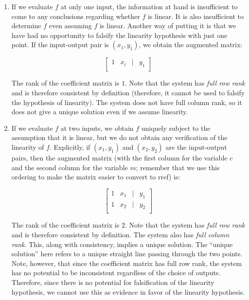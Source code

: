 \documentclass[10pt]{amsart}
\begin{document}
\begin{enumerate}
\item If we evaluate $f$ at only one input, the information at hand is
  insufficient to come to any conclusions regarding whether $f$ is
  linear. It is also insufficient to determine $f$ even assuming $f$
  is linear. Another way of putting it is that we have had no
  opportunity to falsify the linearity hypothesis with just one
  point. If the input-output pair is $(x_1,y_1)$, we obtain the
  augmented matrix:

  $$\left[ \begin{matrix} 1 & x_i & \mid & y_1 \\\end{matrix} \right]$$

  The rank of the coefficient matrix is $1$. Note that the system has
  {\em full row rank} and is therefore consistent by definition
  (therefore, it cannot be used to falsify the hypothesis of
  linearity). The system does not have full column rank, so it does
  not give a unique solution even if we assume linearity.

\item If we evaluate $f$ at two inputs, we obtain $f$ uniquely subject
  to the assumption that it is linear, but we do not obtain any
  verification of the linearity of $f$. Explicitly, if $(x_1,y_1)$ and
  $(x_2,y_2)$ are the input-output pairs, then the augmented matrix
  (with the first column for the variable $c$ and the second column
  for the variable $m$; remember that we use this ordering to make the
  matrix easier to convert to rref) is:

  $$\left[\begin{matrix} 1 & x_1 & \mid & y_1 \\ 1 & x_2 & \mid & y_2 \\\end{matrix}\right]$$

  The rank of the coefficient matrix is $2$. Note that the system has
  {\em full row rank} and is therefore consistent by definition. The
  system also has {\em full column rank}. This, along with
  consistency, implies a unique solution. The ``unique solution'' here
  refers to a unique straight line passing through the two
  points. Note, however, that since the coefficient matrix has full
  row rank, the system has no potential to be inconsistent regardless
  of the choice of outputs. Therefore, since there is no potential for
  falsification of the linearity hypothesis, we cannot use this as
  evidence in favor of the linearity hypothesis.


\end{enumerate}
\end{document}
